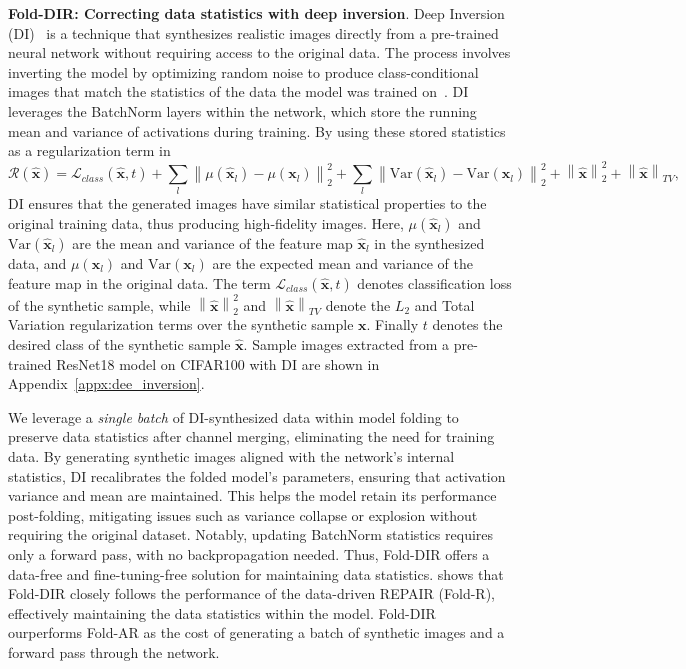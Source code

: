 \documentclass{article}
\newcommand\fakeparagraph[1]{\par\noindent\textbf{{#1}}.\xspace}
\begin{document}
{\fakeparagraph{Fold-DIR: Correcting data statistics with deep inversion}
Deep Inversion (DI)~\citep{yin2020dreamingdistilldatafreeknowledge} is a technique that synthesizes realistic images directly from a pre-trained neural network without requiring access to the original data. The process involves inverting the model by optimizing random noise to produce class-conditional images that match the statistics of the data the model was trained on~\citep{inceptionism2015}. DI leverages the BatchNorm layers within the network, which store the running mean and variance of activations during training. By using these stored statistics as a regularization term in
\[
\mathcal{R}(\hat{\mathbf{x}}) = \mathcal{L}_{class}(\hat{\mathbf{x}}, t) + \sum_{l} \left\| \mu(\hat{\mathbf{x}}_l) - \mu(\mathbf{x}_l) \right\|_2^2 + \sum_{l} \left\| \text{Var}(\hat{\mathbf{x}}_l) - \text{Var}(\mathbf{x}_l) \right\|_2^2 + \left\|\hat{\mathbf{x}}\right\|_2^2 + \left\|\hat{\mathbf{x}}\right\|_{TV},
\]
DI ensures that the generated images have similar statistical properties to the original training data, thus producing high-fidelity images. Here, $\mu(\hat{\mathbf{x}}_l)$ and $\text{Var}(\hat{\mathbf{x}}_l)$ are the mean and variance of the feature map $\hat{\mathbf{x}}_l$ in the synthesized data, and $\mu(\mathbf{x}_l)$ and $\text{Var}(\mathbf{x}_l)$ are the expected mean and variance of the feature map in the original data. The term $\mathcal{L}_{class}(\hat{\mathbf{x}}, t)$ denotes classification loss of the synthetic sample, while $\left\|\hat{\mathbf{x}}\right\|_2^2$ and $\left\|\hat{\mathbf{x}}\right\|_{TV}$ denote the $L_2$ and Total Variation regularization terms over the synthetic sample $\mathbf{x}$. Finally $t$ denotes the desired class of the synthetic sample $\hat{\mathbf{x}}$.  Sample images extracted from a pre-trained ResNet18 model on CIFAR100 with DI are shown in Appendix~\ref{appx:dee_inversion}. 

We leverage a \emph{single batch} of DI-synthesized data within model folding to preserve data statistics after channel merging, eliminating the need for training data. By generating synthetic images aligned with the network's internal statistics, DI recalibrates the folded model's parameters, ensuring that activation variance and mean are maintained. This helps the model retain its performance post-folding, mitigating issues such as variance collapse or explosion without requiring the original dataset. Notably, updating BatchNorm statistics requires only a forward pass, with no backpropagation needed. Thus, Fold-DIR 
offers a data-free and fine-tuning-free solution for maintaining data statistics.  shows that Fold-DIR closely follows the performance of the data-driven REPAIR (Fold-R), effectively maintaining the data statistics within the model. Fold-DIR ourperforms Fold-AR as the cost of generating a batch of synthetic images and a forward pass through the network.

}
\end{document}
